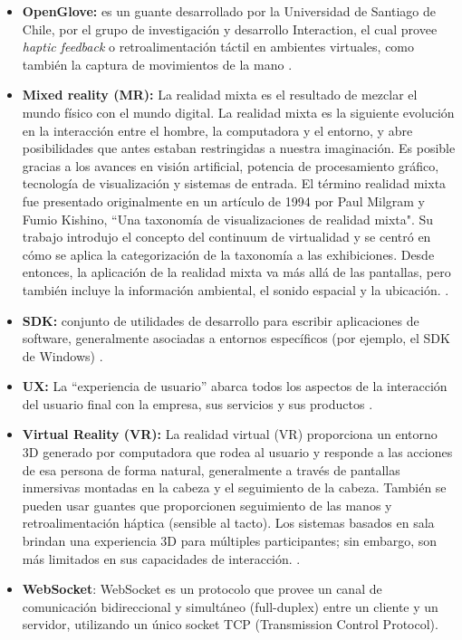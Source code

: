 {\begin{itemize}
\item  \textbf{OpenGlove:} es un guante desarrollado por la Universidad de Santiago de Chile, por el grupo de investigación y desarrollo Interaction, el cual provee \textit{haptic feedback} o retroalimentación táctil en ambientes virtuales, como también la captura de movimientos de la mano \citep{openglove-info-page}.

\item \textbf{Mixed reality (MR):}  La realidad mixta es el resultado de mezclar el mundo físico con el mundo digital. La realidad mixta es la siguiente evolución en la interacción entre el hombre, la computadora y el entorno, y abre posibilidades que antes estaban restringidas a nuestra imaginación. Es posible gracias a los avances en visión artificial, potencia de procesamiento gráfico, tecnología de visualización y sistemas de entrada. El término realidad mixta fue presentado originalmente en un artículo de 1994 por Paul Milgram y Fumio Kishino, ``Una taxonomía de visualizaciones de realidad mixta". Su trabajo introdujo el concepto del continuum de virtualidad y se centró en cómo se aplica la categorización de la taxonomía a las exhibiciones. Desde entonces, la aplicación de la realidad mixta va más allá de las pantallas, pero también incluye la información ambiental, el sonido espacial y la ubicación. \citep{microsoft-MR}.

\item \textbf{SDK:} conjunto de utilidades de desarrollo para escribir aplicaciones de software, generalmente asociadas a entornos específicos (por ejemplo, el SDK de Windows) \citep{gartner-group-SDK}.

\item \textbf{UX:}	La ``experiencia de usuario'' abarca todos los aspectos de la interacción del usuario final con la empresa, sus servicios y sus productos \citep{nngroup-ux}.

\item \textbf{Virtual Reality (VR):}  La realidad virtual (VR) proporciona un entorno 3D generado por computadora que rodea al usuario y responde a las acciones de esa persona de forma natural, generalmente a través de pantallas inmersivas montadas en la cabeza y el seguimiento de la cabeza. También se pueden usar guantes que proporcionen seguimiento de las manos y retroalimentación háptica (sensible al tacto). Los sistemas basados en sala brindan una experiencia 3D para múltiples participantes; sin embargo, son más limitados en sus capacidades de interacción. \citep{gartner-group-VR}.

\item \textbf{WebSocket}: WebSocket es un protocolo que provee un canal de comunicación bidireccional y simultáneo (full-duplex) entre un cliente y un servidor, utilizando un único socket TCP (Transmission Control Protocol). \citep{websocket-html5}

\end{itemize}

}